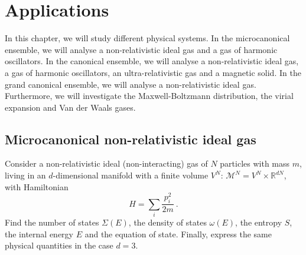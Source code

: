 \chapter{Applications}

    In this chapter, we will study different physical systems. In the microcanonical ensemble, we will analyse a non-relativistic ideal gas and a gas of harmonic oscillators. In the canonical ensemble, we will analyse a non-relativistic ideal gas, a gas of harmonic oscillators, an ultra-relativistic gas and a magnetic solid. In the grand canonical ensemble, we will analyse a non-relativistic ideal gas. Furthermore, we will investigate the Maxwell-Boltzmann distribution, the virial expansion and Van der Waals gases.

\section{Microcanonical non-relativistic ideal gas}

    \begin{exercise}
        Consider a non-relativistic ideal (non-interacting) gas of $N$ particles with mass $m$, living in an $d$-dimensional manifold with a finite volume $V^N$: $\mathcal M^N = V^N \times \mathbb R^{dN}$, with Hamiltonian 
        \begin{equation*}
            H = \sum_i \frac{p^2_i}{2m} ~.
        \end{equation*}
        Find the number of states $\Sigma(E)$, the density of states $\omega(E)$, the entropy $S$, the internal energy $E$ and the equation of state. Finally, express the same physical quantities in the case $d = 3$.
    \end{exercise}

